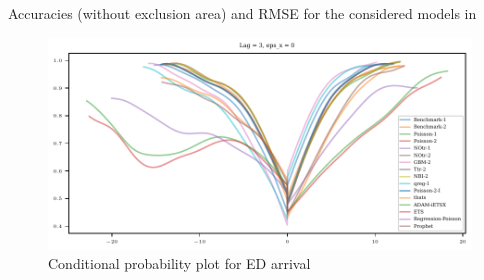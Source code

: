 \begin{table}
\centering

\caption{Accuracies (without exclusion area) and RMSE for the considered models in \textcite{Rostami-Tabar2023}}	
\end{table}

\begin{figure}
	\centering
	\includegraphics{plots/ed_arrival/Cond_Prob_lag_3.pdf}
        \caption{Conditional probability plot for ED arrival}
\end{figure}